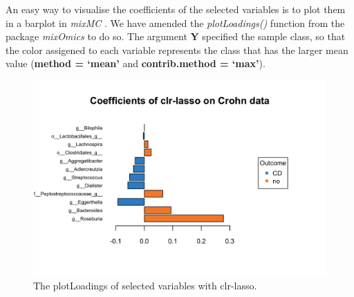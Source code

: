 \documentclass[openany]{book}
\newenvironment{Shaded}{\begin{snugshade}}{\end{snugshade}}
\newcommand{\KeywordTok}[1]{\textcolor[rgb]{0.13,0.29,0.53}{\textbf{#1}}}
\newcommand{\DataTypeTok}[1]{\textcolor[rgb]{0.13,0.29,0.53}{#1}}
\newcommand{\StringTok}[1]{\textcolor[rgb]{0.31,0.60,0.02}{#1}}
\newcommand{\CommentTok}[1]{\textcolor[rgb]{0.56,0.35,0.01}{\textit{#1}}}
\newcommand{\OperatorTok}[1]{\textcolor[rgb]{0.81,0.36,0.00}{\textbf{#1}}}
\newcommand{\NormalTok}[1]{#1}
\begin{document}
An easy way to visualise the coefficients of the selected variables is
to plot them in a barplot in \emph{mixMC} \citep{rohart2017mint}. We
have amended the \emph{plotLoadings()} function from the package
\emph{mixOmics} to do so. The argument \textbf{Y} specified the sample
class, so that the color assigened to each variable represents the class
that has the larger mean value (\textbf{method = `mean'} and
\textbf{contrib.method = `max'}).

\begin{Shaded}
\end{Shaded}

\begin{figure}

{\centering \includegraphics[width=1\linewidth]{./Generated_plots/loadclrCD-1} 

}

\caption{The plotLoadings of selected variables with clr-lasso.}\label{fig:loadclrCD}
\end{figure}
\end{document}
